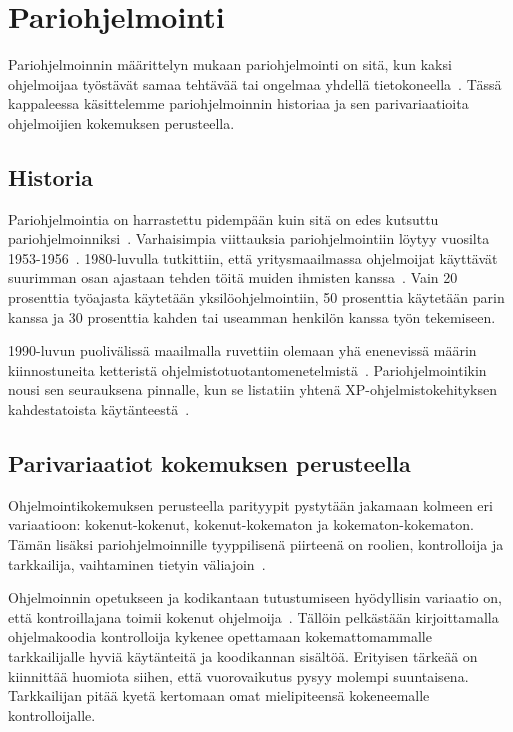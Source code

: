\documentclass[finnish]{tktltiki2}
\theoremstyle{definition}
\theoremstyle{remark}
\begin{document}
\section{Pariohjelmointi}

Pariohjelmoinnin määrittelyn mukaan pariohjelmointi on sitä, kun kaksi ohjelmoijaa työstävät samaa tehtävää tai ongelmaa yhdellä tietokoneella~\cite{nawrocki01exp}. Tässä kappaleessa käsittelemme pariohjelmoinnin historiaa ja sen parivariaatioita ohjelmoijien kokemuksen perusteella.

\subsection{Historia}

Pariohjelmointia on harrastettu pidempään kuin sitä on edes kutsuttu pariohjelmoinniksi~\cite{williams03pair}. Varhaisimpia viittauksia pariohjelmointiin löytyy vuosilta 1953-1956~\cite{williams96pair}. 1980-luvulla tutkittiin, että yritysmaailmassa ohjelmoijat käyttävät suurimman osan ajastaan tehden töitä muiden ihmisten kanssa~\cite{lister87peopleware}. Vain 20 prosenttia työajasta käytetään yksilöohjelmointiin, 50 prosenttia käytetään parin kanssa ja 30 prosenttia kahden tai useamman henkilön kanssa työn tekemiseen.


1990-luvun puolivälissä maailmalla ruvettiin olemaan yhä enenevissä määrin kiinnostuneita ketteristä ohjelmistotuotantomenetelmistä~\cite{martin2003agile}. Pariohjelmointikin nousi sen seurauksena pinnalle, kun se listatiin yhtenä XP-ohjelmistokehityksen kahdestatoista käytänteestä~\cite{beck00extreme}.

\subsection{Parivariaatiot kokemuksen perusteella}

Ohjelmointikokemuksen perusteella parityypit pystytään jakamaan kolmeen eri variaatioon: kokenut-kokenut, kokenut-kokematon ja kokematon-kokematon. Tämän lisäksi pariohjelmoinnille tyyppilisenä piirteenä on roolien, kontrolloija ja tarkkailija, vaihtaminen tietyin väliajoin~\cite{williams02support}.


Ohjelmoinnin opetukseen ja kodikantaan tutustumiseen hyödyllisin variaatio on, että kontroillajana toimii kokenut ohjelmoija~\cite{chong2007social}. Tällöin pelkästään kirjoittamalla ohjelmakoodia kontrolloija kykenee opettamaan kokemattomammalle tarkkailijalle hyviä käytänteitä ja koodikannan sisältöä. Erityisen tärkeää on kiinnittää huomiota siihen, että vuorovaikutus pysyy molempi suuntaisena. Tarkkailijan pitää kyetä kertomaan omat mielipiteensä kokeneemalle kontrolloijalle.
\end{document}
